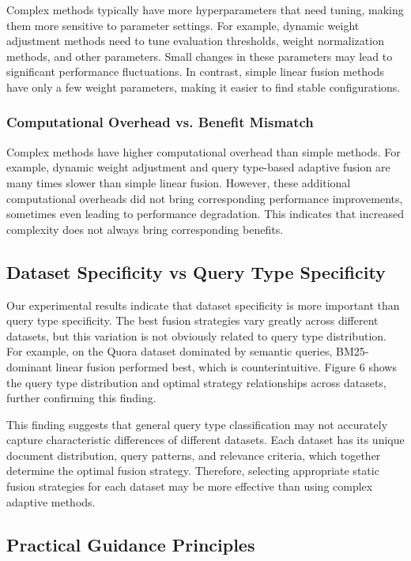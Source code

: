 \documentclass[letterpaper]{article} %
\begin{document}
Complex methods typically have more hyperparameters that need tuning, making them more sensitive to parameter settings. For example, dynamic weight adjustment methods need to tune evaluation thresholds, weight normalization methods, and other parameters. Small changes in these parameters may lead to significant performance fluctuations. In contrast, simple linear fusion methods have only a few weight parameters, making it easier to find stable configurations.

\subsubsection{Computational Overhead vs. Benefit Mismatch}

Complex methods have higher computational overhead than simple methods. For example, dynamic weight adjustment and query type-based adaptive fusion are many times slower than simple linear fusion. However, these additional computational overheads did not bring corresponding performance improvements, sometimes even leading to performance degradation. This indicates that increased complexity does not always bring corresponding benefits.

\subsection{Dataset Specificity vs Query Type Specificity}

Our experimental results indicate that dataset specificity is more important than query type specificity. The best fusion strategies vary greatly across different datasets, but this variation is not obviously related to query type distribution. For example, on the Quora dataset dominated by semantic queries, BM25-dominant linear fusion performed best, which is counterintuitive. Figure 6 shows the query type distribution and optimal strategy relationships across datasets, further confirming this finding.

This finding suggests that general query type classification may not accurately capture characteristic differences of different datasets. Each dataset has its unique document distribution, query patterns, and relevance criteria, which together determine the optimal fusion strategy. Therefore, selecting appropriate static fusion strategies for each dataset may be more effective than using complex adaptive methods.

\subsection{Practical Guidance Principles}
\end{document}
